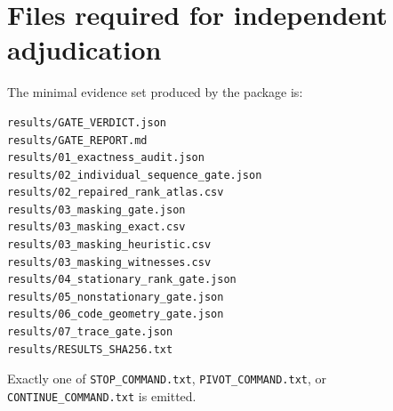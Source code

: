 \documentclass[11pt]{article}
\begin{document}
\section{Files required for independent adjudication}

The minimal evidence set produced by the package is:
\begin{verbatim}
results/GATE_VERDICT.json
results/GATE_REPORT.md
results/01_exactness_audit.json
results/02_individual_sequence_gate.json
results/02_repaired_rank_atlas.csv
results/03_masking_gate.json
results/03_masking_exact.csv
results/03_masking_heuristic.csv
results/03_masking_witnesses.csv
results/04_stationary_rank_gate.json
results/05_nonstationary_gate.json
results/06_code_geometry_gate.json
results/07_trace_gate.json
results/RESULTS_SHA256.txt
\end{verbatim}
Exactly one of \texttt{STOP\_COMMAND.txt}, \texttt{PIVOT\_COMMAND.txt}, or \texttt{CONTINUE\_COMMAND.txt} is emitted.
\end{document}
